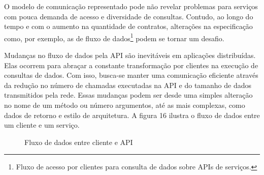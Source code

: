 O modelo de comunicação representado pode não revelar problemas para serviços com pouca demanda de acesso e diversidade de consultas. Contudo, ao longo do tempo e com o aumento na quantidade de contratos, alterações na especificação como, por exemplo, as de fluxo de dados\footnote{
  Fluxo de acesso por clientes para consulta de dados sobre APIs de serviços.
} podem se tornar um desafio.

Mudanças no fluxo de dados pela API são inevitáveis em aplicações distribuídas. Elas ocorrem para abraçar a constante transformação por clientes na execução de consultas de dados. Com isso, busca-se manter uma comunicação eficiente através da redução no número de chamadas executadas na API e do tamanho de dados transmitidos pela rede. Essas mudanças podem ser desde uma simples alteração no nome de um método ou número argumentos, até as mais complexas, como dados de retorno e estilo de arquitetura. A figura 16 ilustra o fluxo de dados entre um cliente e um serviço.

\begin{figure}[H]
  \centering
  \caption{Fluxo de dados entre cliente e API}
\end{figure}

